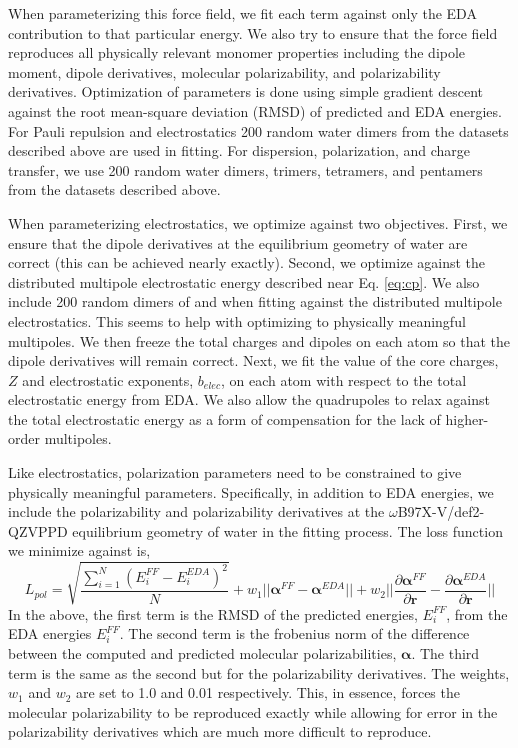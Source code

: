 \documentclass[journal=jacsat,manuscript=article]{achemso}
\begin{document}
When parameterizing this force field, we fit each term against only the EDA contribution
to that particular energy. We also try to ensure that the force field reproduces
all physically relevant monomer properties including the dipole moment, dipole derivatives,
molecular polarizability, and polarizability derivatives. Optimization of parameters is done using simple gradient descent
against the root mean-square deviation (RMSD) of predicted and EDA energies.
For Pauli repulsion and electrostatics 200 random water dimers from the datasets
described above are used in fitting. For dispersion, polarization, and charge transfer, we use
200 random water dimers, trimers, tetramers, and pentamers from the datasets described above.

When parameterizing electrostatics, we optimize against two objectives. First, we ensure
that the dipole derivatives at the equilibrium geometry of water are correct (this can be achieved
nearly exactly). Second, we optimize against the distributed multipole electrostatic energy described
near Eq. \ref{eq:cp}. We also include 200 random dimers
of  and  when fitting against the distributed multipole electrostatics.
This seems to help with optimizing to physically meaningful multipoles.
We then freeze the total charges and dipoles on each atom so that the dipole derivatives
will remain correct. Next, we fit the value of the core charges, $Z$ and electrostatic exponents, $b_{elec}$, on each atom
with respect to the total electrostatic energy from EDA. We also allow the quadrupoles to relax
against the total electrostatic energy as a form of compensation for the lack of higher-order multipoles.

Like electrostatics, polarization parameters need to be constrained to give physically meaningful
parameters. Specifically, in addition to EDA energies, we include the polarizability and polarizability derivatives
at the $\omega$B97X-V/def2-QZVPPD equilibrium geometry of water in the fitting process.
The loss function we minimize against is,
\begin{equation}
  L_{pol}=\sqrt{\frac{\sum_{i=1}^{N}(E_i^{FF}-E_i^{EDA})^2}{N}} + w_1||\bm{\alpha}^{FF}-\bm{\alpha}^{EDA}||+w_2||\frac{\partial\bm{\alpha}^{FF}}{\partial \bm{r}}-\frac{\partial\bm{\alpha}^{EDA}}{\partial \bm{r}}||
\label{eq:pol_loss}
\end{equation}
\noindent
In the above, the first term is the RMSD of the predicted energies, $E_i^{FF}$, from the
EDA energies $E_i^{FF}$. The second term is the frobenius norm of the difference between the
computed and predicted molecular polarizabilities, $\bm{\alpha}$. The third term is the same as
the second but for the polarizability derivatives. The weights, $w_1$ and $w_2$ are set to
1.0 and 0.01 respectively. This, in essence, forces the molecular polarizability to be
reproduced exactly while allowing for error in the polarizability derivatives which are much
more difficult to reproduce.
\end{document}

